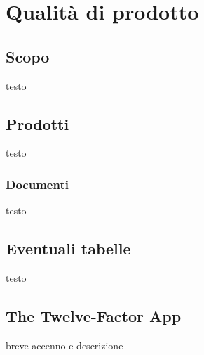 \section{Qualità di prodotto}

\subsection{Scopo}
testo

\subsection{Prodotti}
testo

	\subsubsection{Documenti}
	testo
	
\subsection{Eventuali tabelle}
testo

\subsection{The Twelve-Factor App}
breve accenno e descrizione	    